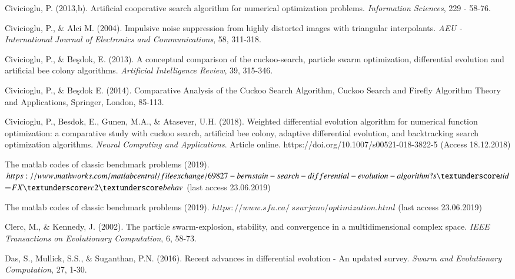 \documentclass[preprint,10pt,3p]{elsarticle}
\begin{document}
\begin{thebibliography}{00}
 Civicioglu, P. (2013,b). Artificial cooperative search algorithm for numerical optimization problems. \emph{Information Sciences}, 229 - 58-76.

 Civicioglu, P., \& Alci M. (2004). Impulsive noise suppression from highly distorted images with triangular interpolants. \emph{AEU - International Journal of Electronics and Communications}, 58,  311-318.

  Civicioglu, P., \& Be\c{s}dok, E. (2013). A conceptual comparison of the cuckoo-search, particle swarm optimization, differential evolution and artificial bee colony algorithms. \emph{Artificial Intelligence Review}, 39, 315-346.

  Civicioglu, P., \& Be\c{s}dok E. (2014). Comparative Analysis of the Cuckoo Search Algorithm,  Cuckoo Search and Firefly Algorithm Theory and Applications, Springer, London,  85-113.

   Civicioglu, P., Besdok, E., Gunen, M.A., \& Atasever, U.H. (2018). Weighted differential evolution algorithm for numerical function optimization: a comparative study with cuckoo search, artificial bee colony, adaptive differential evolution, and backtracking search optimization algorithms. \emph{Neural Computing and Applications}. Article online. https://doi.org/10.1007/s00521-018-3822-5  (Access 18.12.2018)

 The matlab codes of classic benchmark problems (2019). $ https://www.mathworks.com/matlabcentral/fileexchange/69827-bernstain-search-differential-evolution-algorithm?s\textunderscore
tid$=$FX\textunderscore rc2\textunderscore behav$ (last access 23.06.2019)

 The matlab codes of classic benchmark problems (2019). $https://www.sfu.ca/~ssurjano/optimization.html$ (last access 23.06.2019)

   Clerc, M., \& Kennedy, J. (2002). The particle swarm-explosion, stability, and convergence in a multidimensional complex space. \emph{IEEE Transactions on Evolutionary Computation}, 6, 58-73.

  Das, S., Mullick, S.S., \& Suganthan, P.N. (2016). Recent advances in differential evolution - An updated survey.  \emph{Swarm and Evolutionary Computation}, 27, 1-30.


\end{thebibliography}
\end{document}
